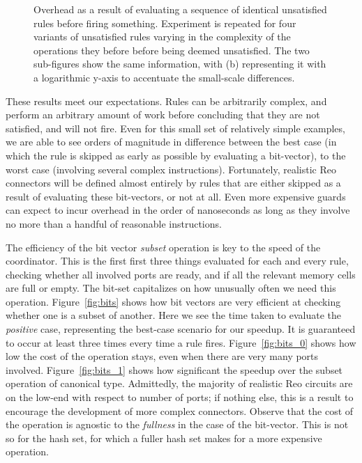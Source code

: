 \begin{figure}
{\begin{subfigure}[b]{0.63\textwidth}
			\caption{}
			\label{fig:check_time_2}
		\end{subfigure}%
	}
	\caption[Overhead of evaluating unsatisfied rules.]{Overhead as a result of evaluating a sequence of identical unsatisfied rules before firing something. Experiment is repeated for four variants of unsatisfied rules varying in the complexity of the operations they before before being deemed unsatisfied. The two sub-figures show the same information, with (b) representing it with a logarithmic y-axis to accentuate the small-scale differences.}
	\label{fig:check_time}
\end{figure}

These results meet our expectations. Rules can be arbitrarily complex, and perform an arbitrary amount of work before concluding that they are not satisfied, and will not fire. Even for this small set of relatively simple examples, we are able to see orders of magnitude in difference between the best case (in which the rule is skipped as early as possible by evaluating a bit-vector), to the worst case (involving several complex instructions). Fortunately, realistic Reo connectors will be defined almost entirely by rules that are either skipped as a result of evaluating these bit-vectors, or not at all. Even more expensive guards can expect to incur overhead in the order of nanoseconds as long as they involve no more than a handful of reasonable instructions. 

The efficiency of the bit vector \textit{subset} operation is key to the speed of the coordinator. This is the first first three things evaluated for each and every rule, checking whether all involved ports are ready, and if all the relevant memory cells are full or empty. The bit-set capitalizes on how unusually often we need this operation. Figure~\ref{fig:bits} shows how bit vectors are very efficient at checking whether one is a subset of another. Here we see the time taken to evaluate the \textit{positive} case, representing the best-case scenario for our speedup. It is guaranteed to occur at least three times every time a rule fires. Figure~\ref{fig:bits_0} shows how low the cost of the operation stays, even when there are very many ports involved. Figure~\ref{fig:bits_1} shows how significant the speedup over the subset operation of canonical  type. Admittedly, the majority of realistic Reo circuits are on the low-end with respect to number of ports; if nothing else, this is a result to encourage the development of more complex connectors. Observe that the cost of the operation is agnostic to the \textit{fullness} in the case of the bit-vector. This is not so for the hash set, for which a fuller hash set makes for a more expensive operation. 



